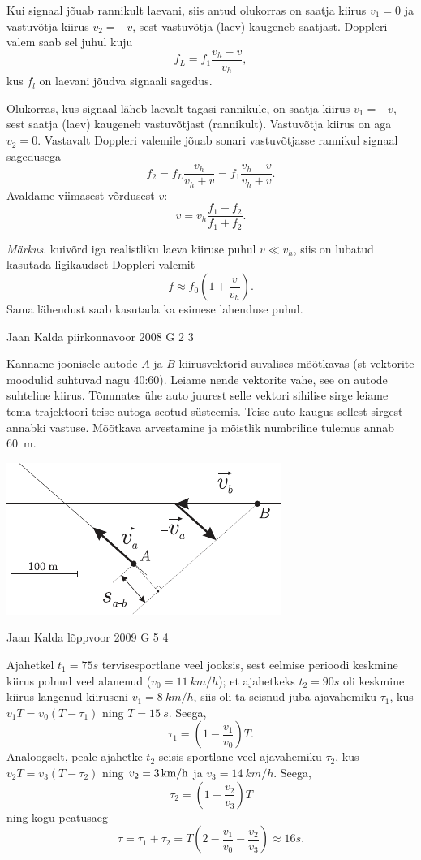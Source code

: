 \documentclass[11pt, twoside]{article}
\begin{document}
{{Kui signaal jõuab rannikult laevani, siis antud olukorras on saatja kiirus $v_1 = 0$ ja vastuvõtja kiirus $v_2 = -v$, sest vastuvõtja (laev) kaugeneb saatjast. Doppleri valem saab sel juhul kuju
\[
f_L = f_1 \frac{v_h-v}{v_h}, 
\]
kus $f_l$ on laevani jõudva signaali sagedus.

Olukorras, kus signaal läheb laevalt tagasi rannikule, on saatja kiirus $v_1 = -v$, sest saatja (laev) kaugeneb vastuvõtjast (rannikult). Vastuvõtja kiirus on aga $v_2 = 0$. Vastavalt Doppleri valemile jõuab sonari vastuvõtjasse rannikul signaal sagedusega
\[
f_2 = f_L \frac{v_h}{v_h+v} = f_1 \frac{v_h-v}{v_h+v}. 
\]
Avaldame viimasest võrdusest $v$:
\[
v = v_h \frac{f_1-f_2}{f_1+f_2}. 
\]

\emph{Märkus}. kuivõrd iga realistliku laeva kiiruse puhul $v \ll v_h$, siis on lubatud
kasutada ligikaudset Doppleri valemit
\[
f \approx f_0 \left(1+\frac{v}{v_h}\right).
\]
Sama lähendust saab kasutada ka esimese lahenduse puhul.
\fi
}

{Jaan Kalda} %
{piirkonnavoor} %
{2008} %
{G 2} %
{3} %
{

\ifSolution
Kanname joonisele autode $A$ ja $B$ kiirusvektorid suvalises mõõtkavas (st vektorite moodulid suhtuvad nagu 40:60). Leiame nende vektorite vahe, see on autode suhteline kiirus. Tõmmates ühe auto juurest selle vektori sihilise sirge leiame tema trajektoori teise autoga seotud süsteemis. Teise auto kaugus sellest sirgest annabki vastuse. Mõõtkava arvestamine ja mõistlik numbriline tulemus annab \SI{60}{m}.
\begin{center}
	\includegraphics[width=0.7\linewidth]{2008-v2g-02-lah}
\end{center}
\fi
}

{Jaan Kalda} %
{lõppvoor} %
{2009} %
{G 5} %
{4} %
{

\ifSolution
Ajahetkel $t_1=\SI{75}s$ tervisesportlane veel jooksis, sest eelmise perioodi keskmine kiirus polnud veel alanenud ($v_0=\SI{11}{km/h}$);
et ajahetkeks $t_2=\SI {90}s$ oli keskmine kiirus langenud kiiruseni $v_1=\SI{8}{km/h}$, siis oli ta seisnud juba ajavahemiku
$\tau_1$, kus $v_1 T= v_0 (T-\tau_1)$ ning $T=\SI{15}{s}$. Seega, 
\[
\tau_1=\left(1-\frac{v_1}{v_0}\right)T.
\]
Analoogselt, peale ajahetke $t_2$ seisis
sportlane veel ajavahemiku $\tau_2$, kus $v_2 T= v_3 (T-\tau_2)$ ning $v_2=\SI 3{km/h}$ ja $v_3=\SI{14}{km/h}$. Seega, 
\[
\tau_2=\left(1-\frac{v_2}{v_3}\right)T
\]
ning kogu peatusaeg
\[
\tau=\tau_1+\tau_2=T\left(2-\frac{v_1}{v_0}- \frac{v_2}{v_3}\right)\approx \SI{16}s.
\]
\fi
}

}
\end{document}

